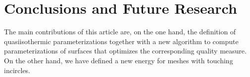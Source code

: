 \documentclass[twoside]{article}
\begin{document}
%
%
%

\section{Conclusions and Future Research}
\label{sec:future}
The main contributions of this article are, on the one hand, the definition of 
quasiisothermic parameterizations together with a new algorithm to
compute parameterizations of surfaces that optimizes the corresponding quality measure.
On the other hand, we have defined a new energy for meshes with touching incircles.

\end{document}
